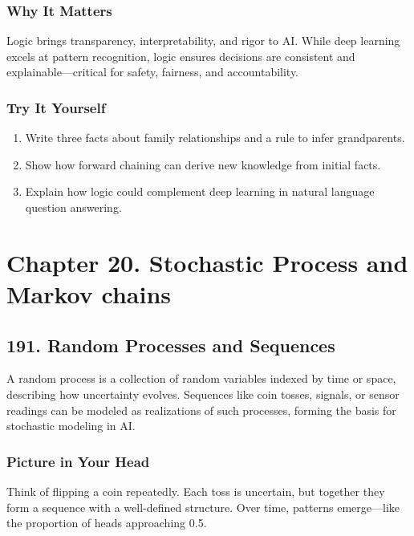 \documentclass[
  letterpaper,
  DIV=11,
  numbers=noendperiod]{scrreprt}
\providecommand{\tightlist}{%
  \setlength{\itemsep}{0pt}\setlength{\parskip}{0pt}}
\begin{document}
\subsubsection{Why It Matters}\label{why-it-matters-87}

Logic brings transparency, interpretability, and rigor to AI. While deep
learning excels at pattern recognition, logic ensures decisions are
consistent and explainable---critical for safety, fairness, and
accountability.

\subsubsection{Try It Yourself}\label{try-it-yourself-189}

\begin{enumerate}
\def\labelenumi{\arabic{enumi}.}
\tightlist
\item
  Write three facts about family relationships and a rule to infer
  grandparents.
\item
  Show how forward chaining can derive new knowledge from initial facts.
\item
  Explain how logic could complement deep learning in natural language
  question answering.
\end{enumerate}

\section{Chapter 20. Stochastic Process and Markov
chains}\label{chapter-20.-stochastic-process-and-markov-chains}

\subsection{191. Random Processes and
Sequences}\label{random-processes-and-sequences}

A random process is a collection of random variables indexed by time or
space, describing how uncertainty evolves. Sequences like coin tosses,
signals, or sensor readings can be modeled as realizations of such
processes, forming the basis for stochastic modeling in AI.

\subsubsection{Picture in Your Head}\label{picture-in-your-head-190}

Think of flipping a coin repeatedly. Each toss is uncertain, but
together they form a sequence with a well-defined structure. Over time,
patterns emerge---like the proportion of heads approaching 0.5.
\end{document}
